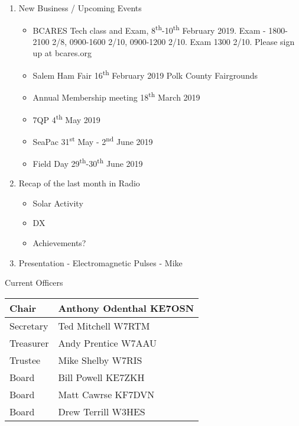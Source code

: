 \documentclass[letter,11pt]{extarticle}
\begin{document}
\begin{enumerate}
		\item  New Business / Upcoming Events
			\begin{itemize}
				\item BCARES Tech class and Exam, 8\textsuperscript{th}-10\textsuperscript{th} February 2019. Exam - 1800-2100 2/8, 0900-1600 2/10, 0900-1200 2/10. Exam 1300 2/10. Please sign up at bcares.org 
				\item Salem Ham Fair 16\textsuperscript{th} February 2019 Polk County Fairgrounds
				\item Annual Membership meeting 18\textsuperscript{th} March 2019
				\item 7QP 4\textsuperscript{th} May 2019
				\item SeaPac 31\textsuperscript{st} May - 2\textsuperscript{nd} June 2019
				\item Field Day 29\textsuperscript{th}-30\textsuperscript{th} June 2019
			\end{itemize}
		\item Recap of the last month in Radio
			\begin{itemize}
				\item Solar Activity
				\item DX
				\item Achievements?
			\end{itemize}
		\item  Presentation - Electromagnetic Pulses - Mike

	\end{enumerate}


	Current Officers \\
	\begin{tabular}{|l|l|} \hline
		Chair & Anthony Odenthal KE7OSN \\ \hline
		Secretary & Ted Mitchell W7RTM \\ \hline
		Treasurer & Andy Prentice W7AAU \\ \hline
		Trustee & Mike Shelby W7RIS   \\ \hline
		Board & Bill Powell KE7ZKH \\ \hline
		Board & Matt Cawrse KF7DVN \\ \hline
		Board & Drew Terrill W3HES\\ \hline
	\end{tabular}
	
	\subsection*{}
	
\end{document}
